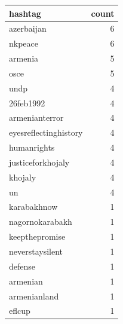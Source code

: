 \begin{tabular}{lr}
\toprule
hashtag & count \\
\midrule
azerbaijan & 6 \\
nkpeace & 6 \\
armenia & 5 \\
osce & 5 \\
undp & 4 \\
26feb1992 & 4 \\
armenianterror & 4 \\
eyesreflectinghistory & 4 \\
humanrights & 4 \\
justiceforkhojaly & 4 \\
khojaly & 4 \\
un & 4 \\
karabakhnow & 1 \\
nagornokarabakh & 1 \\
keepthepromise & 1 \\
neverstaysilent & 1 \\
defense & 1 \\
armenian & 1 \\
armenianland & 1 \\
eflcup & 1 \\
\bottomrule
\end{tabular}
